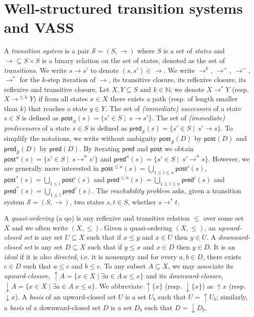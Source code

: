 \documentclass[runningheads]{llncs}
\newcommand{\pred}{\textsf{pred}}
\newcommand{\post}{\textsf{post}}
\begin{document}
\section{Well-structured transition systems and VASS}\label{section definitions}



\noindent
 A {\em transition system} is a pair $\mathscr{S} = (S,\rightarrow )$ where $S$ is a set of 
 {\em states} and  
 $ {\rightarrow} \subseteq S \times S$ is a
 binary relation 
 on
 the set of states, denoted as the set of {\em transitions}. 
%
We write $s \rightarrow s'$ to denote $ (s,s') \in  {\rightarrow} $.
We write $\rightarrow^{k}$, $\rightarrow^{+}$, $\rightarrow^{=}$, $\rightarrow^{*}$
for the $k$-step iteration of $\rightarrow$, its transitive closure, its reflexive closure, its reflexive and transitive closure.
Let $X,Y \subseteq S$ and $k \in \mathbb{N}$; we denote $X \longrightarrow^{*} Y$ (resp. $X \longrightarrow^{\leq k} Y$) if from all states $x \in X$ there exists a path (resp. of length smaller than $k$) that reaches a state $y \in Y$.
\noindent
The set of {\em (immediate) successors} of a state $s \in S$ is defined as 
 $\post_{\mathscr{S}}(s) = \{ s' \in S \mid  ~ s \xrightarrow{} s'\}$. 
The set of {\em (immediate) predecessors} of a state $s \in S$ is deﬁned as
 $\pred_{\mathscr{S}}(s) = \{ s' \in S \mid  ~ s' \xrightarrow{} s\}$. 
To simplify the notations, we write without ambiguity $\post_{\mathscr{S}}(D)$ by $\post(D)$ and  $\pred_{\mathscr{S}}(D)$ by  $\pred(D)$.
By iterating $\pred$ and $\post$ we obtain  
$\post^n(s) = \{ s' \in S \mid  ~ s \xrightarrow{}^n s'\}$
and
$\pred^n(s) = \{ s' \in S \mid  ~ s' \xrightarrow{}^n s\}$.
However, we are generally more interested in
$\post^{\leq n}(s) = \bigcup_{1 \leq i \leq n} \post^i(s)$, $\post^*(s)= \bigcup_{1 \leq i} \post^i(s)$
and
$\pred^{\leq n}(s) = \bigcup_{1 \leq i \leq n} \pred^i(s)$ and $\pred^*(s) = \bigcup_{1 \leq i} \pred^i(s)$. 
The {\em reachability problem} asks, given a transition system $\mathscr{S} = (S, \to)$, two states $s, t \in S$, whether $s \to^* t$. 

%


A {\em quasi-ordering} (a qo) is any reflexive and transitive relation $\leq$ over some set $X$ and we often write $(X,\leq)$. 
Given a quasi-ordering $(X,\leq)$, an {\em upward-closed set} is any set $U \subseteq X$ such that if $x \leq y$ and $x \in U$ then $y \in U $.
A {\em downward-closed set} is any set $D \subseteq X$ such that if $y \leq x$ and $x \in D$ then $y \in D $. 
It is an {\em ideal } if it is also {\em directed}, i.e. it is nonempty and for every $a,b \in D$, there exists $c \in D$ such that $a \leq c$ and $b \leq c$.
To any subset $A \subseteq X$, we may associate
its {\em upward-closure},
 $\mathop{\uparrow} A = \{x \in X \mid \exists a \in A ~ a \leq x\}$
 and its 
 {\em downward-closure},
 $\mathop{\downarrow} A = \{x \in X \mid \exists a \in A ~ x \leq a\}$. 
We abbreviate $\mathop{\uparrow} \{x\}$ (resp. $\mathop{\downarrow} \{x\}$)
as $\mathop{\uparrow} x$ (resp. $\mathop{\downarrow} x$).
%
A {\em basis} of an upward-closed set $U$ is a set $U_b$ such that $U = \mathop{\uparrow} U_b$; similarly, a {\em basis} of a downward-closed set $D$ is a set $D_b$ such that $D = \mathop{\downarrow} D_b$.
\end{document}
